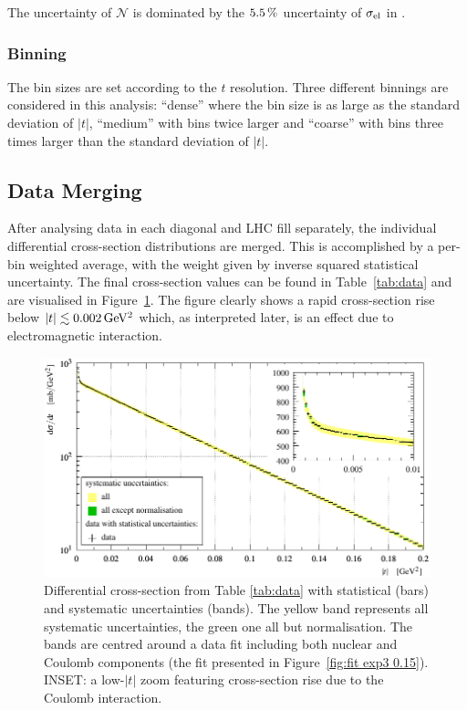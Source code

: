 The uncertainty of $\mathcal{N}$ is dominated by the $5.5\,{\rm \%}$ uncertainty of $\sigma_{\rm el}$ in \cite{totem-13tev-90m}.



\subsubsection{Binning}
\label{sec:binning}

The bin sizes are set according to the $t$ resolution. Three different binnings are considered in this analysis: ``dense'' where the bin size is as large as the standard deviation of $|t|$, ``medium'' with bins twice larger and ``coarse'' with bins three times larger than the standard deviation of $|t|$.




\subsection{Data Merging}
\label{sec:data merging}

After analysing data in each diagonal and LHC fill separately, the individual differential cross-section distributions are merged. This is accomplished by a per-bin weighted average, with the weight given by inverse squared statistical uncertainty. The final cross-section values can be found in Table~\ref{tab:data} and are visualised in Figure~\ref{fig:dsdt}. The figure clearly shows a rapid cross-section rise below $|t| \lesssim 0.002\,{\rm GeV^2}$ which, as interpreted later, is an effect due to electromagnetic interaction.

\begin{figure}
\vskip-5mm
\begin{center}
\includegraphics{fig/t_dist_merged_with_unc.pdf}
\caption{%
Differential cross-section from Table \ref{tab:data} with statistical (bars) and systematic uncertainties (bands). The yellow band represents all systematic uncertainties, the green one all but normalisation. The bands are centred around a data fit including both nuclear and Coulomb components (the fit presented in Figure~\ref{fig:fit exp3 0.15}). INSET: a low-$|t|$ zoom featuring cross-section rise due to the Coulomb interaction.
}
\label{fig:dsdt}
\end{center}
\end{figure}


